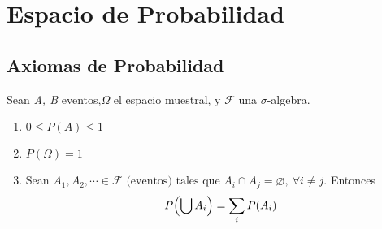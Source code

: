 \chapter{Espacio de Probabilidad}



\section{Axiomas de Probabilidad}

Sean \textit{A, B} eventos,$\Omega$ el espacio muestral, y $\mathcal F$ una $\sigma$-algebra.

\begin{enumerate}
  \item $0 \le P(A) \le 1$
  \item $P(\Omega) = 1$
  \item Sean $A_1, A_2, \cdots \in \mathcal F \text{ (eventos) tales que } A_i \cap A_j = \varnothing, ~\forall i \neq j.$ Entonces $$P\parens*{\bigcup A_i} = \sum_i P(A_i)$$
\end{enumerate}

